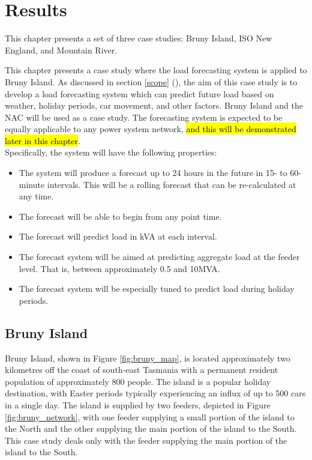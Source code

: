 \chapter{Results}
This chapter presents a set of three case studies: Bruny Island, ISO New England, and Mountain River.


This chapter presents a case study where the load forecasting system is applied to Bruny Island.
As discussed in section \ref{scope} (), the aim of this case study is to develop a load forecasting system which can predict future load based on weather, holiday periods, car movement, and other factors. 
Bruny Island and the NAC will be used as a case study. 
The forecasting system is expected to be equally applicable to any power system network, \hl{and this will be demonstrated later in this chapter}.
\\
Specifically, the system will have the following properties:
\begin{itemize}
	\item The system will produce a forecast up to 24 hours in the future in 15- to 60-minute intervals. This will be a rolling forecast that can be re-calculated at any time.
	\item The forecast will be able to begin from any point time.
	\item The forecast will predict load in kVA at each interval.
	\item The forecast system will be aimed at predicting aggregate load at the feeder level. That is, between approximately 0.5 and 10MVA.
	\item The forecast system will be especially tuned to predict load during holiday periods.
\end{itemize}

\section{Bruny Island}
Bruny Island, shown in Figure \ref{fig:bruny_map}, is located approximately two kilometres off the coast of south-east Tasmania with a permanent resident population of approximately 800 people.
The island is a popular holiday destination, with Easter periods typically experiencing an influx of up to 500 cars in a single day.
The island is supplied by two feeders, depicted in Figure \ref{fig:bruny_network}, with  one feeder supplying a small portion of the island to the North and the other supplying the main portion of the island to the South.
This case study deals only with the feeder supplying the main portion of the island to the South.

